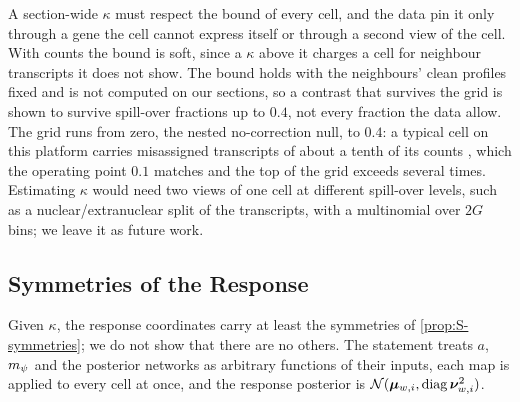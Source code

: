 A section-wide $\kappa$ must respect the bound of every cell, and the data pin it only through a gene the cell cannot express itself or through a second view of the cell. With counts the bound is soft, since a $\kappa$ above it charges a cell for neighbour transcripts it does not show. The bound holds with the neighbours' clean profiles fixed and is not computed on our sections, so a contrast that survives the grid is shown to survive spill-over fractions up to $0.4$, not every fraction the data allow. The grid runs from zero, the nested no-correction null, to $0.4$: a typical cell on this platform carries misassigned transcripts of about a tenth of its counts \citep{yang2025mistic}, which the operating point $0.1$ matches and the top of the grid exceeds several times. Estimating $\kappa$ would need two views of one cell at different spill-over levels, such as a nuclear/extranuclear split of the transcripts, with a multinomial over $2G$ bins; we leave it as future work.

\subsection{Symmetries of the Response}
\label{app:symmetries}

Given $\kappa$, the response coordinates carry at least the symmetries of \cref{prop:S-symmetries}; we do not show that there are no others. The statement treats $a$, $m_{\psi}$ and the posterior networks as arbitrary functions of their inputs, each map is applied to every cell at once, and the response posterior is $\mathcal{N}(\boldsymbol{\mu}_{w,i}, \operatorname{diag}\boldsymbol{\nu}_{w,i}^2)$.

